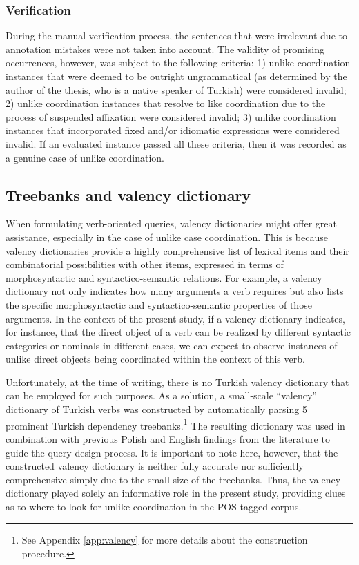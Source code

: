 \subsubsection{Verification}

During the manual verification process, the sentences that were irrelevant due to annotation mistakes were not taken into account. The validity of promising occurrences, however, was subject to the following criteria: 1) unlike coordination instances that were deemed to be outright ungrammatical (as determined by the author of the thesis, who is a native speaker of Turkish) were considered invalid; 2) unlike coordination instances that resolve to like coordination due to the process of suspended affixation were considered invalid; 3) unlike coordination instances that incorporated fixed and/or idiomatic expressions were considered invalid. If an evaluated instance passed all these criteria, then it was recorded as a genuine case of unlike coordination.

\subsection{Treebanks and valency dictionary}

When formulating verb-oriented queries, valency dictionaries might offer great assistance, especially in the case of unlike case coordination. This is because valency dictionaries provide a highly comprehensive list of lexical items and their combinatorial possibilities with other items, expressed in terms of morphosyntactic and syntactico-semantic relations. For example, a valency dictionary not only indicates how many arguments a verb requires but also lists the specific morphosyntactic and syntactico-semantic properties of those arguments. In the context of the present study, if a valency dictionary indicates, for instance, that the direct object of a verb can be realized by different syntactic categories or nominals in different cases, we can expect to observe instances of unlike direct objects being coordinated within the context of this verb. 

Unfortunately, at the time of writing, there is no Turkish valency dictionary that can be employed for such purposes. As a solution, a small-scale ``valency'' dictionary of Turkish verbs was constructed by automatically parsing 5 prominent Turkish dependency treebanks.\footnote{See Appendix \ref{app:valency} for more details about the construction procedure.} The resulting dictionary was used in combination with previous Polish and English findings from the literature to guide the query design process. It is important to note here, however, that the constructed valency dictionary is neither fully accurate nor sufficiently comprehensive simply due to the small size of the treebanks. Thus, the valency dictionary played solely an informative role in the present study, providing clues as to where to look for unlike coordination in the POS-tagged corpus.

